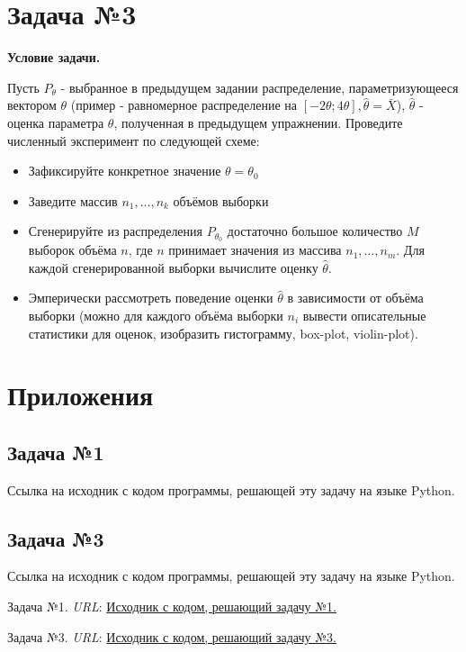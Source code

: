 \documentclass[12pt]{article}
\begin{document}
\section*{Задача №3}

\textbf{Условие задачи.}

Пусть $P_{\theta}$ - выбранное в предыдущем задании распределение, параметризующееся вектором $\theta$ (пример - равномерное распределение на $[-2\theta; 4\theta], \hat{\theta} = \bar{X}$), $\hat{\theta}$ - оценка параметра $\theta$, полученная в предыдущем упражнении. Проведите численный эксперимент по следующей схеме:
\begin{itemize}
    \item Зафиксируйте конкретное значение $\theta=\theta_0$
    \item Заведите массив ${n_1, ..., n_k}$ объёмов выборки
    \item Сгенерируйте из распределения $P_{\theta_0}$ достаточно большое количество $M$ выборок объёма $n$, где $n$ принимает значения из массива ${n_1, ..., n_m}$. Для каждой сгенерированной выборки вычислите оценку $\hat{\theta}$.
    \item Эмперически рассмотреть поведение оценки $\hat{\theta}$ в зависимости от объёма выборки (можно для каждого объёма выборки $n_i$ вывести описательные статистики для оценок, изобразить гистограмму, box-plot, violin-plot).
\end{itemize}
\newpage
{}
\section*{Приложения}

\subsection*{Задача №1}

Ссылка на исходник с кодом программы, решающей эту задачу на языке Python. \cite{TaskNumber1}

\subsection*{Задача №3}
Ссылка на исходник с кодом программы, решающей эту задачу на языке Python. \cite{TaskNumber3}
\newpage

\begin{thebibliography}{99}
    Задача №1. \textit{URL}: \href{https://colab.research.google.com/drive/10P1FfFSNAT1sFofKclQP3D2H63IfjJ5n#scrollTo=sdMVrQmwrOrM}{Исходник с кодом, решающий задачу №1.}
    
    Задача №3. \textit{URL}:
\href{https://colab.research.google.com/drive/1oKAvJfOlzvyp6hB6qVOLeUKA08yHvjOA?usp=sharing#scrollTo=IJjFoXfdsgKB}{Исходник с кодом, решающий задачу №3.}
\end{thebibliography}
\end{document}
